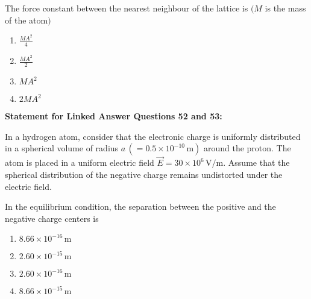         \item The force constant between the nearest neighbour of the lattice is $(M$ is the mass of the atom$)$
        \begin{enumerate}
            \item $\frac{M A^2}{4}$
            \item $\frac{M A^2}{2}$
            \item $M A^2$
            \item $2 M A^2$
        \end{enumerate}
   
  
\textbf{Statement for Linked Answer Questions 52 and 53:}

In a hydrogen atom, consider that the electronic charge is uniformly distributed in a spherical volume of radius $a \, (= 0.5 \times 10^{-10} \, \text{m})$ around the proton. The atom is placed in a uniform electric field $\vec{E} = 30 \times 10^6 \, \text{V/m}$. Assume that the spherical distribution of the negative charge remains undistorted under the electric field.


    \item In the equilibrium condition, the separation between the positive and the negative charge centers is
    \begin{enumerate}
        \item $8.66 \times 10^{-16} \, \text{m}$
        \item $2.60 \times 10^{-15} \, \text{m}$
        \item $2.60 \times 10^{-16} \, \text{m}$
        \item $8.66 \times 10^{-15} \, \text{m}$
    \end{enumerate}
\par

